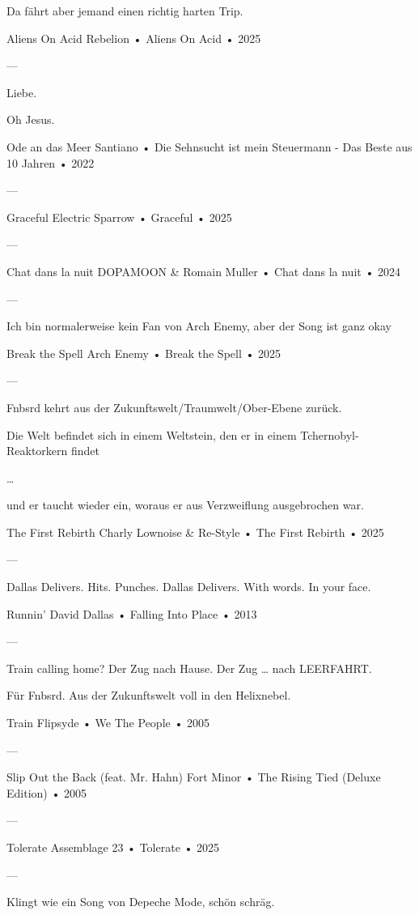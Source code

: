 Da fährt aber jemand einen richtig harten Trip.

Aliens On Acid
Rebelion
 •
Aliens On Acid
 • 2025

—

Liebe.

Oh Jesus.

Ode an das Meer
Santiano
 •
Die Sehnsucht ist mein Steuermann - Das Beste aus 10 Jahren
 •
2022


—

Graceful
Electric Sparrow
 •
Graceful
 •
2025

—

Chat dans la nuit
DOPAMOON
 &
Romain Muller
 •
Chat dans la nuit
 •
2024

—

Ich bin normalerweise kein Fan von Arch Enemy, aber der Song ist ganz okay

Break the Spell
Arch Enemy
 •
Break the Spell
 •
2025

—

Fnbsrd kehrt aus der Zukunftswelt/Traumwelt/Ober-Ebene zurück.

Die Welt befindet sich in einem Weltstein, den er in einem Tchernobyl-Reaktorkern findet

…

und er taucht wieder ein, woraus er aus Verzweiflung ausgebrochen war.

The First Rebirth
Charly Lownoise
 &
Re-Style
 •
The First Rebirth
 •
2025



—

Dallas Delivers.
Hits.
Punches.
Dallas Delivers.
With words.
In your face.


Runnin'
David Dallas
 •
Falling Into Place
 •
2013


—

Train calling home? Der Zug nach Hause. Der Zug … nach LEERFAHRT.

Für Fnbsrd. Aus der Zukunftswelt voll in den Helixnebel.

Train
Flipsyde
 •
We The People
 •
2005

—

Slip Out the Back (feat. Mr. Hahn)
Fort Minor
 •
The Rising Tied (Deluxe Edition)
 •
2005


—

Tolerate
Assemblage 23
 •
Tolerate
 • 2025

—

Klingt wie ein Song von Depeche Mode, schön schräg.

